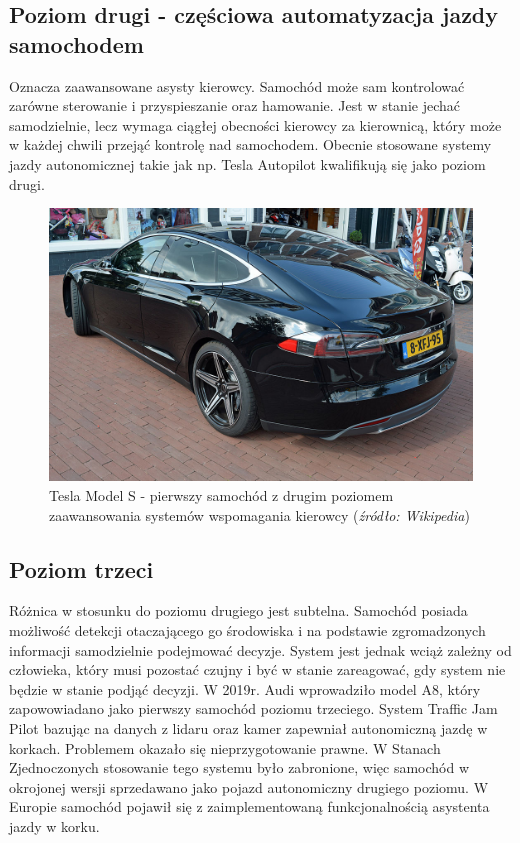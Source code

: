 \subsection{Poziom drugi - częściowa automatyzacja jazdy samochodem}
Oznacza zaawansowane asysty kierowcy. Samochód może sam kontrolować zarówne sterowanie i przyspieszanie oraz hamowanie. Jest w stanie jechać samodzielnie, lecz wymaga ciągłej obecności kierowcy za kierownicą, który może w każdej chwili przejąć kontrolę nad samochodem. Obecnie stosowane systemy jazdy autonomicznej takie jak np. Tesla Autopilot kwalifikują się jako poziom drugi.

\begin{figure}
  \centering
  \includegraphics[width=12cm]{img/tesla.jpg}
  \caption{Tesla Model S - pierwszy samochód z drugim poziomem zaawansowania systemów wspomagania kierowcy (\textit{źródło: Wikipedia})}
  \label{fig:teslas}
\end{figure}

\subsection{Poziom trzeci}
Różnica w stosunku do poziomu drugiego jest subtelna. Samochód posiada możliwość detekcji otaczającego go środowiska i na podstawie zgromadzonych informacji samodzielnie podejmować decyzje. System jest jednak wciąż zależny od człowieka, który musi pozostać czujny i być w stanie zareagować, gdy system nie będzie w stanie podjąć decyzji. W 2019r. Audi wprowadziło model A8, który zapowowiadano jako pierwszy samochód poziomu trzeciego. System Traffic Jam Pilot bazując na danych z lidaru oraz kamer zapewniał autonomiczną jazdę w korkach. Problemem okazało się nieprzygotowanie prawne. W Stanach Zjednoczonych stosowanie tego systemu było zabronione, więc samochód w okrojonej wersji sprzedawano jako pojazd autonomiczny drugiego poziomu. W Europie samochód pojawił się z zaimplementowaną funkcjonalnością asystenta jazdy w korku.

